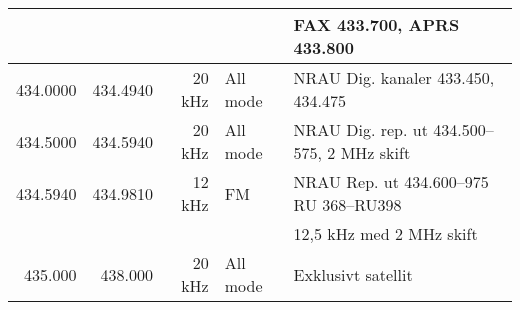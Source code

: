 {{\begin{tabular}{rrrll}
	                  &          &             &                 & FAX 433.700, APRS 433.800                         \\ \hline
	         434.0000 & 434.4940 &      20 kHz & All mode        & NRAU Dig. kanaler 433.450, 434.475                \\ \hline
	         434.5000 & 434.5940 &      20 kHz & All mode        & NRAU Dig. rep. ut 434.500--575, 2 MHz skift       \\ \hline
	         434.5940 & 434.9810 &      12 kHz & FM              & NRAU Rep. ut 434.600--975 RU 368--RU398           \\
	                  &          &             &                 & 12,5 kHz med 2 MHz skift                          \\ \hline
	          435.000 &  438.000 &      20 kHz & All mode        & Exklusivt satellit
\end{tabular}}

}
